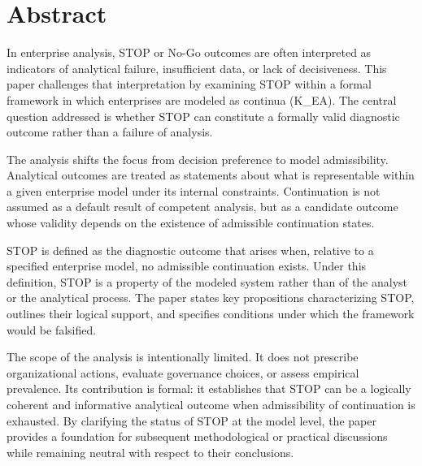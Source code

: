 ﻿\section*{Abstract}

In enterprise analysis, STOP or No-Go outcomes are often interpreted as indicators of analytical failure, insufficient data, or lack of decisiveness. This paper challenges that interpretation by examining STOP within a formal framework in which enterprises are modeled as continua (K\_EA). The central question addressed is whether STOP can constitute a formally valid diagnostic outcome rather than a failure of analysis.

The analysis shifts the focus from decision preference to model admissibility. Analytical outcomes are treated as statements about what is representable within a given enterprise model under its internal constraints. Continuation is not assumed as a default result of competent analysis, but as a candidate outcome whose validity depends on the existence of admissible continuation states.

STOP is defined as the diagnostic outcome that arises when, relative to a specified enterprise model, no admissible continuation exists. Under this definition, STOP is a property of the modeled system rather than of the analyst or the analytical process. The paper states key propositions characterizing STOP, outlines their logical support, and specifies conditions under which the framework would be falsified.

The scope of the analysis is intentionally limited. It does not prescribe organizational actions, evaluate governance choices, or assess empirical prevalence. Its contribution is formal: it establishes that STOP can be a logically coherent and informative analytical outcome when admissibility of continuation is exhausted. By clarifying the status of STOP at the model level, the paper provides a foundation for subsequent methodological or practical discussions while remaining neutral with respect to their conclusions.
